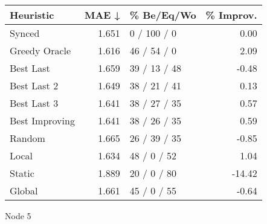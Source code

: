 \begin{tabular}{lrlr}
\toprule
\textbf{Heuristic} & \textbf{MAE ↓} & \textbf{\% Be/Eq/Wo} & \textbf{\% Improv.} \\
\midrule
            Synced &          1.651 &          0 / 100 / 0 &                0.00 \\
     Greedy Oracle &          1.616 &          46 / 54 / 0 &                2.09 \\
         Best Last &          1.659 &         39 / 13 / 48 &               -0.48 \\
       Best Last 2 &          1.649 &         38 / 21 / 41 &                0.13 \\
       Best Last 3 &          1.641 &         38 / 27 / 35 &                0.57 \\
    Best Improving &          1.641 &         38 / 26 / 35 &                0.59 \\
            Random &          1.665 &         26 / 39 / 35 &               -0.85 \\
             Local &          1.634 &          48 / 0 / 52 &                1.04 \\
            Static &          1.889 &          20 / 0 / 80 &              -14.42 \\
            Global &          1.661 &          45 / 0 / 55 &               -0.64 \\
\bottomrule
\end{tabular}
\caption{Node 5}
\label{tab:ds_non_lr05_le1_bs4_5}
